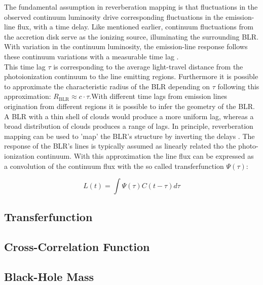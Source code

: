 The fundamental assumption in reverberation mapping is that fluctuations in the observed continuum luminosity drive corresponding fluctuations in the emission-line flux, with a time delay. Like mentioned earlier, continuum fluctuations from the accretion disk serve as the ionizing source, illuminating the surrounding BLR. With variation in the continuum luminosity, the emission-line response follows these continuum variations with a measurable time lag \parencite{Cackett2021}.\\
This time lag $\tau$ is corresponding to the average light-travel distance from the photoionization continuum to the line emitting regions. Furthermore it is possible to approximate the characteristic radius of the BLR depending on $\tau$ following this approximation: $R_{\mathrm{BLR}} \approx c \cdot \tau$.With different time lags from emission lines origination from different regions it is possible to infer the geometry of the BLR. A BLR with a thin shell of clouds would produce a more uniform lag, whereas a broad distribution of clouds produces a range of lags. In principle, reverberation mapping can be used to 'map' the BLR’s structure by inverting the delays \parencite{peterson1997introduction}.
The response of the BLR's lines is typically assumed as linearly related tho the photo-ionization continuum. With this approximation the line flux can be expressed as a convolution of the continuum flux with the so called transferfunction $\Psi\left(\tau\right)$:

\begin{equation}
	L\left(t\right) = \int \Psi\left(\tau\right)C\left(t-\tau\right) d\tau
\end{equation}
	




\subsection{Transferfunction}
\label{subsec:rm_transferfunction}

\subsection{Cross-Correlation Function}
\label{subsec:rm_ccf}

\subsection{Black-Hole Mass}
\label{subsec:rm_bh_mass}

